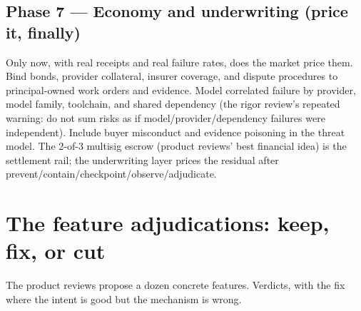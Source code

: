 \documentclass[11pt,a4paper]{article}
\begin{document}
\subsection*{Phase 7 --- Economy and underwriting (price it, finally)}
Only now, with real receipts and real failure rates, does the market price them. Bind bonds, provider collateral, insurer coverage, and dispute procedures to principal-owned work orders and evidence. Model correlated failure by provider, model family, toolchain, and shared dependency (the rigor review's repeated warning: do not sum risks as if model/provider/dependency failures were independent). Include buyer misconduct and evidence poisoning in the threat model. The 2-of-3 multisig escrow (product reviews' best financial idea) is the settlement rail; the underwriting layer prices the residual after prevent/contain/checkpoint/observe/adjudicate.

\section{The feature adjudications: keep, fix, or cut}
The product reviews propose a dozen concrete features. Verdicts, with the fix where the intent is good but the mechanism is wrong.
\end{document}
